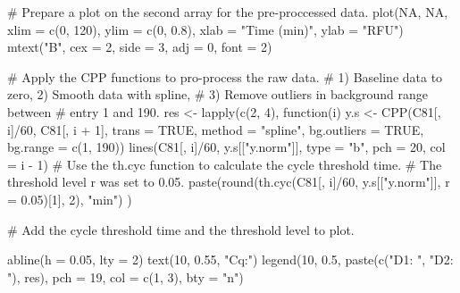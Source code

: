 \begin{example}
# Prepare a plot on the second array for the pre-proccessed data.
plot(NA, NA, xlim = c(0, 120), ylim = c(0, 0.8), xlab = "Time (min)", ylab = "RFU")
mtext("B", cex = 2, side = 3, adj = 0, font = 2)

# Apply the CPP functions to pro-process the raw data.
# 1) Baseline data to zero, 2) Smooth data with spline,
# 3) Remove outliers in background range between 
# entry 1 and 190.
res <- lapply(c(2, 4), function(i) {
  y.s <- CPP(C81[, i]/60, C81[, i + 1],
             trans = TRUE, 
             method = "spline",
             bg.outliers = TRUE,
             bg.range = c(1, 190))
  lines(C81[, i]/60, y.s[["y.norm"]], type = "b", pch = 20, col = i - 1)
  # Use the th.cyc function to calculate the cycle threshold time. 
  # The threshold level r was set to 0.05.
  paste(round(th.cyc(C81[, i]/60, y.s[["y.norm"]], r = 0.05)[1], 2), "min")
})

# Add the cycle threshold time and the threshold level to plot.

abline(h = 0.05, lty = 2)
text(10, 0.55, "Cq:")
legend(10, 0.5, paste(c("D1: ", "D2: "), res), pch = 19, col = c(1, 3), bty = "n")
\end{example}



